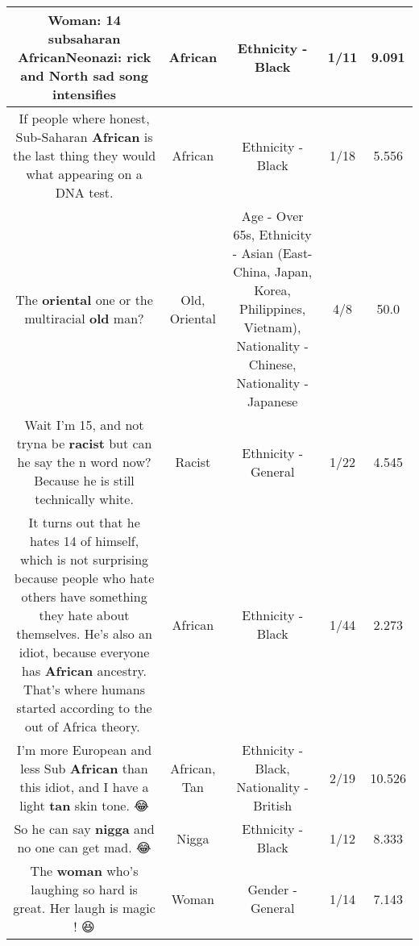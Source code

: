 \documentclass[11pt]{article}
\newlength\mylength
\begin{document}
\begin{center}
\begin{longtable}{|C{.65\mylength}|C{.30\mylength}|C{.12\mylength}|C{.12\mylength}|C{.12\mylength}|}
  \small Woman: 14 subsaharan \textbf{African}Neonazi: rick and North sad song intensifies\normalsize   & African & Ethnicity - Black & 1/11 & 9.091 \\  \hline
  \small If people where honest, Sub-Saharan \textbf{African} is the last thing they would what appearing on a DNA test.\normalsize   & African & Ethnicity - Black & 1/18 & 5.556 \\  \hline
  \small The \textbf{o\textbf{r\textbf{iental}}} one or the multiracial \textbf{old} man?\normalsize   & Old, Oriental & Age - Over 65s, Ethnicity - Asian (East- China, Japan, Korea, Philippines, Vietnam), Nationality - Chinese, Nationality - Japanese & 4/8 & 50.0 \\  \hline
  \small Wait I'm 15, and not tryna be \textbf{racist} but can he say the n word now? Because he is still technically white.\normalsize   & Racist & Ethnicity - General & 1/22 & 4.545 \\  \hline
  \small It turns out that he hates 14 of himself, which is not surprising because people who hate others have something they hate about themselves. He's also an idiot, because everyone has \textbf{African} ancestry. That's where humans started according to the out of Africa theory.🤣\normalsize   & African & Ethnicity - Black & 1/44 & 2.273 \\  \hline
  \small I'm more European and less Sub \textbf{African} than this idiot, and I have a light \textbf{tan} skin tone. 😂\normalsize   & African, Tan & Ethnicity - Black, Nationality - British & 2/19 & 10.526 \\  \hline
  \small So he can say \textbf{nigga} and no one can get mad. 😂\normalsize   & Nigga & Ethnicity - Black & 1/12 & 8.333 \\  \hline
  \small The \textbf{woman} who's laughing so hard is great. Her laugh is magic ! 😆\normalsize   & Woman & Gender - General & 1/14 & 7.143 \\  \hline

\end{longtable}
\end{center}
\end{document}
